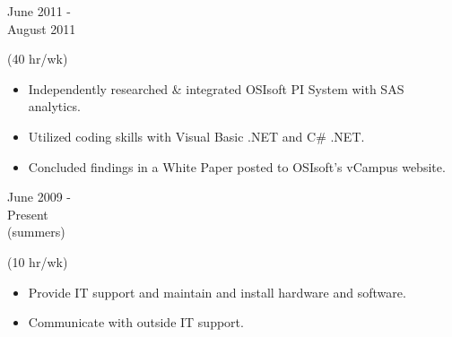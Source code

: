 %


\flushleft \begin{minipage}[t]{\dateColWidth}
June 2011 - \\[0.2 em]
August 2011
\end{minipage}
\begin{minipage}[t]{0.8\textwidth}
 (40 hr/wk) \\[-1 em]
\begin{adjustwidth}{2.5 em}{0 em} 

\begin{itemize} \itemsep-2pt
\setlength{\itemindent}{-2 em}

\item Independently researched \& integrated OSIsoft PI System with SAS analytics.
\item Utilized coding skills with Visual Basic .NET and C\# .NET.
\item Concluded findings in a White Paper posted to OSIsoft's vCampus website.
\end{itemize}

\end{adjustwidth}
\end{minipage}
\divLine

\flushleft \begin{minipage}[t]{\dateColWidth}
June 2009 - \\[0.2 em] 
Present \\(summers)
\end{minipage}
\begin{minipage}[t]{0.8\textwidth}
 (10 hr/wk) \\[-1 em]
\begin{adjustwidth}{2.5 em}{0 em}

\begin{itemize} \itemsep-2pt
\setlength{\itemindent}{-2 em}

\item Provide IT support and maintain and install hardware and software.
\item Communicate with outside IT support.

\end{itemize}
\end{adjustwidth}
\end{minipage}